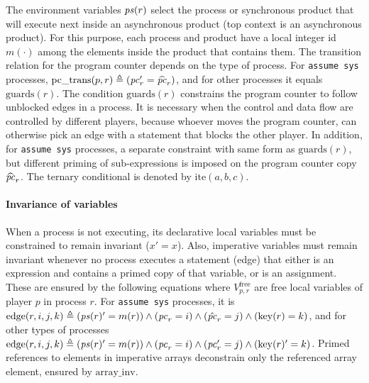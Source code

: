 \documentclass[copyright]{eptcs}
\begin{document}
The environment variables $\mathit{ps}(r)$ select the process or synchronous product that will execute next inside an asynchronous product (top context is an asynchronous product).
For this purpose, each process and product have a local integer id $m(\cdot)$ among the elements inside the product that contains them.
The transition relation for the program counter depends on the type of process.
For \texttt{assume sys} processes,
$\mathrm{pc\_trans}(p, r) \triangleq (\mathit{pc}_r' = \widehat{\mathit{pc}}_r)$, and for other processes it equals $\mathrm{guards}(r)$.
The condition $\mathrm{guards}(r)$ constrains the program counter to follow unblocked edges in a process.
It is necessary when the control and data flow are controlled by different players, because whoever moves the program counter, can otherwise pick an edge with a statement that blocks the other player.
In addition, for \texttt{assume sys} processes, a separate constraint with same form as $\mathrm{guards}(r)$, but different priming of sub-expressions is imposed on the program counter copy $\widehat{\mathit{pc}}_r$.
The ternary conditional is denoted by $\mathrm{ite}(a, b, c)$.


\paragraph{Invariance of variables}

When a process is not executing, its declarative local variables must be constrained to remain invariant ($x' = x$).
Also, imperative variables must remain invariant whenever no process executes a statement (edge) that either is an expression and contains a primed copy of that variable, or is an assignment.
These are ensured by the following equations
where $V^{\text{free}}_{p, r}$ are free local variables of player $p$ in process $r$.
For \texttt{assume sys} processes, it is
$\mathrm{edge}(r, i, j, k)
\triangleq
(\mathit{ps}(r)' = m(r)) \wedge
(\mathit{pc}_r = i) \wedge
(\hat{\mathit{pc}}_r = j) \wedge
(\mathrm{key}(r) = k)
$, and for other types of processes
$\mathrm{edge}(r, i, j, k)
\triangleq
(\mathit{ps}(r)' = m(r)) \wedge
(\mathit{pc}_r = i) \wedge
(\mathit{pc}_r' = j) \wedge
(\mathrm{key}(r)' = k)
$.
Primed references to elements in imperative arrays deconstrain only the referenced array element, ensured by $\mathrm{array\_inv}$.
\end{document}
